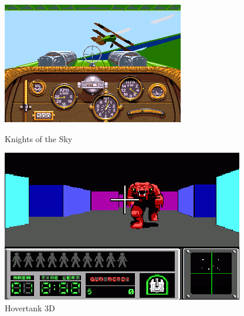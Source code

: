 \documentclass[12pt]{report}
\begin{document}
\begin{figure}
	\begin{minipage}{0.48\textwidth}
		\includegraphics[width=\linewidth]{image/knights-of-the-sky.png}
		\hspace*{-0.5cm}
		\caption{Knights of the Sky}
		\label{fig:knights-of-the-sky}
	\end{minipage}
	\begin{minipage}{0.48\textwidth}
		\centering
		\includegraphics[width=\linewidth]{image/Hovertank_3D.png}
		\hspace*{-0.5cm}
		\caption{Hovertank 3D}
		\label{fig:hovertank3d}
	\end{minipage}
\end{figure}
\end{document}
